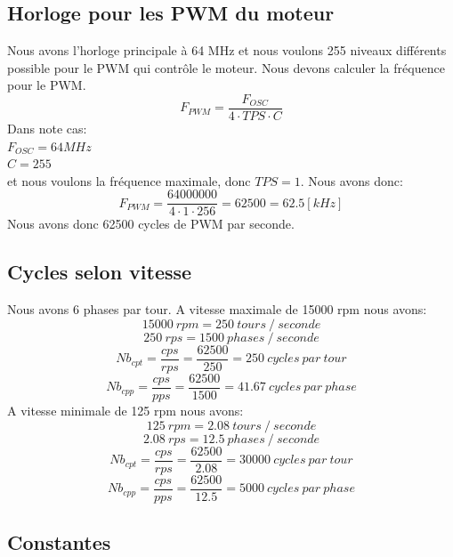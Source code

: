 \documentclass[fleqn, 11pt, a4paper]{article}
\begin{document}
  \subsection{Horloge pour les PWM du moteur}
  Nous avons l'horloge principale à 64 MHz et nous voulons 255 niveaux différents possible pour le PWM qui contrôle le moteur.
  Nous devons calculer la fréquence pour le PWM.
  $$F_{PWM} = \frac{F_{OSC}}{4 \cdot TPS \cdot C}$$
  Dans note cas:\\
  $F_{OSC} = 64 MHz$\\
  $C = 255$\\
  et nous voulons la fréquence maximale, donc $TPS = 1$.
  Nous avons donc:
  $$F_{PWM} = \frac{64000000}{4 \cdot 1 \cdot 256} = 62500 = 62.5 [kHz]$$
  Nous avons donc 62500 cycles de PWM par seconde.
  
  \subsection{Cycles selon vitesse}
  Nous avons 6 phases par tour.
  A vitesse maximale de 15000 rpm nous avons:
  $$15000 \ rpm = 250\ tours\ /\ seconde$$
  $$ 250 \ rps = 1500\ phases\ /\ seconde$$
  $$Nb_{cpt} = \frac{cps}{rps} = \frac{62500}{250} = 250\ cycles\ par\ tour$$
  $$Nb_{cpp} = \frac{cps}{pps} = \frac{62500}{1500} = 41.67\ cycles\ par\ phase$$
  A vitesse minimale de 125 rpm nous avons:
  $$125 \ rpm = 2.08\ tours\ /\ seconde$$
  $$ 2.08 \ rps = 12.5\ phases\ /\ seconde$$
  $$Nb_{cpt} = \frac{cps}{rps} = \frac{62500}{2.08} = 30000\ cycles\ par\ tour$$
  $$Nb_{cpp} = \frac{cps}{pps} = \frac{62500}{12.5} = 5000\ cycles\ par\ phase$$

	\newpage
	\begin{appendix}
	\section{Constantes}

	
	\end{appendix}
	
	
\end{document}
